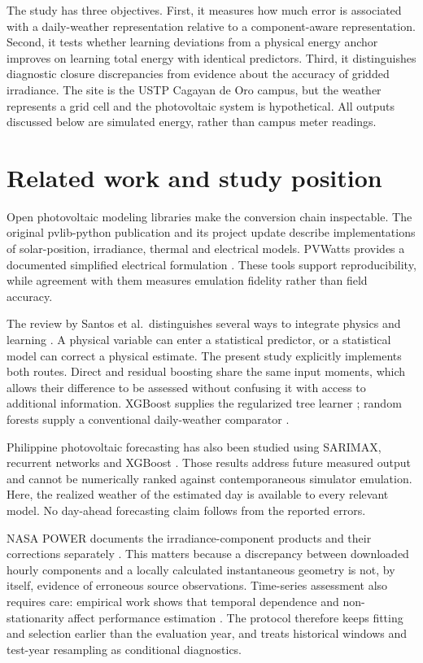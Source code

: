 \documentclass[11pt,a4paper]{article}
\begin{document}
The study has three objectives. First, it measures how much error is associated with a daily-weather representation relative to a component-aware representation. Second, it tests whether learning deviations from a physical energy anchor improves on learning total energy with identical predictors. Third, it distinguishes diagnostic closure discrepancies from evidence about the accuracy of gridded irradiance. The site is the USTP Cagayan de Oro campus, but the weather represents a grid cell and the photovoltaic system is hypothetical. All outputs discussed below are simulated energy, rather than campus meter readings.

\section{Related work and study position}
Open photovoltaic modeling libraries make the conversion chain inspectable. The original pvlib-python publication \cite{holmgren2018} and its project update \cite{anderson2023} describe implementations of solar-position, irradiance, thermal and electrical models. PVWatts provides a documented simplified electrical formulation \cite{dobos2014}. These tools support reproducibility, while agreement with them measures emulation fidelity rather than field accuracy.

The review by Santos et al.\ distinguishes several ways to integrate physics and learning \cite{santos2024}. A physical variable can enter a statistical predictor, or a statistical model can correct a physical estimate. The present study explicitly implements both routes. Direct and residual boosting share the same input moments, which allows their difference to be assessed without confusing it with access to additional information. XGBoost supplies the regularized tree learner \cite{chen2016}; random forests supply a conventional daily-weather comparator \cite{breiman2001}.

Philippine photovoltaic forecasting has also been studied using SARIMAX, recurrent networks and XGBoost \cite{benitez2023}. Those results address future measured output and cannot be numerically ranked against contemporaneous simulator emulation. Here, the realized weather of the estimated day is available to every relevant model. No day-ahead forecasting claim follows from the reported errors.

NASA POWER documents the irradiance-component products and their corrections separately \cite{power,powercomponents}. This matters because a discrepancy between downloaded hourly components and a locally calculated instantaneous geometry is not, by itself, evidence of erroneous source observations. Time-series assessment also requires care: empirical work shows that temporal dependence and non-stationarity affect performance estimation \cite{cerqueira2020}. The protocol therefore keeps fitting and selection earlier than the evaluation year, and treats historical windows and test-year resampling as conditional diagnostics.
\end{document}
